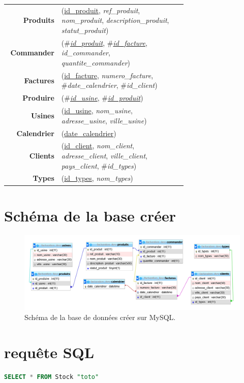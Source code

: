 \documentclass[french]{article}
\newenvironment{mld}
  {\par\begin{minipage}{\linewidth}\begin{tabular}{rp{0.7\linewidth}}}
  {\end{tabular}\end{minipage}\par}
\newcommand{\attr}[1]{\emph{#1}}
\newcommand{\prim}[1]{\uline{#1}}
\newcommand{\foreign}[1]{\#\textsl{#1}}
\begin{document}
\begin{mld}
  \textbf{Produits} & (\prim{id\_produit}, \attr{ref\_produit}, \attr{nom\_produit}, \attr{description\_produit}, \attr{statut\_produit})\\
  \textbf{Commander} & (\foreign{\prim{id\_produit}}, \foreign{\prim{id\_facture}}, \attr{id\_commander}, \attr{quantite\_commander})\\
  \textbf{Factures} & (\prim{id\_facture}, \attr{numero\_facture}, \foreign{date\_calendrier}, \foreign{id\_client})\\
  \textbf{Produire} & (\foreign{\prim{id\_usine}}, \foreign{\prim{id\_produit}})\\
  \textbf{Usines} & (\prim{id\_usine}, \attr{nom\_usine}, \attr{adresse\_usine}, \attr{ville\_usine})\\
  \textbf{Calendrier} & (\prim{date\_calendrier})\\
  \textbf{Clients} & (\prim{id\_client}, \attr{nom\_client}, \attr{adresse\_client}, \attr{ville\_client}, \attr{pays\_client}, \foreign{id\_types})\\
  \textbf{Types} & (\prim{id\_types}, \attr{nom\_types})\\
\end{mld}

\newpage
\section{Schéma de la base créer}

\begin{figure}[!htbp]
    \centering
    \includegraphics[width=\textwidth]{Rapport/Image/schema_bdd.PNG}
    \caption{Schéma de la base de données créer sur MySQL.}
    \label{fig:schema_bdd}
\end{figure}


\section{requête SQL}

\begin{lstlisting}[language=sql]
SELECT * FROM Stock "toto"
\end{lstlisting}
\end{document}
